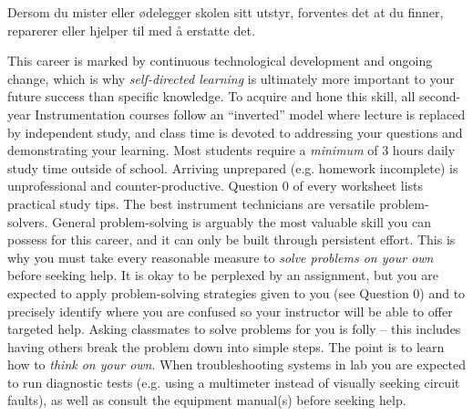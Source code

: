 %

\noindent
{} Dersom du mister eller ødelegger skolen sitt utstyr, forventes det at du finner, reparerer eller hjelper til med å erstatte det. 
\vskip 10pt
\vfil

\noindent
{} This career is marked by continuous technological development and ongoing change, which is why {\it self-directed learning} is ultimately more important to your future success than specific knowledge.  To acquire and hone this skill, all second-year Instrumentation courses follow an ``inverted'' model where lecture is replaced by independent study, and class time is devoted to addressing your questions and demonstrating your learning.  Most students require a {\it minimum} of 3 hours daily study time outside of school.  Arriving unprepared (e.g. homework incomplete) is unprofessional and counter-productive.  Question 0 of every worksheet lists practical study tips.
\vskip 10pt
\noindent
{} The best instrument technicians are versatile problem-solvers.  General problem-solving is arguably the most valuable skill you can possess for this career, and it can only be built through persistent effort.  This is why you must take every reasonable measure to {\it solve problems on your own} before seeking help.  It is okay to be perplexed by an assignment, but you are expected to apply problem-solving strategies given to you (see Question 0) and to precisely identify where you are confused so your instructor will be able to offer targeted help.  Asking classmates to solve problems for you is folly -- this includes having others break the problem down into simple steps.  The point is to learn how to {\it think on your own}.  When troubleshooting systems in lab you are expected to run diagnostic tests (e.g. using a multimeter instead of visually seeking circuit faults), as well as consult the equipment manual(s) before seeking help.  
\vskip 10pt
\eject

